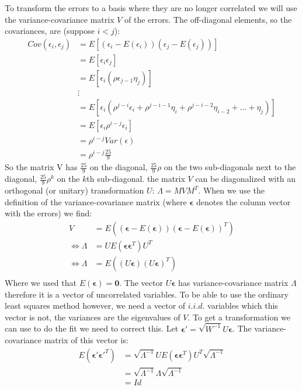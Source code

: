 \documentclass[a4paper]{article}
\begin{document}
To transform the errors to a basis where they are no longer correlated we will use the variance-covariance matrix $V$ of the errors. 
The off-diagonal elements, so the covariances, are (suppose $i < j$):
\begin{align*}
	Cov(\epsilon_i, \epsilon_j) &= E[(\epsilon_i-E(\epsilon_i))(\epsilon_j-E(\epsilon_j))]\\
				    &= E[\epsilon_i \epsilon_j]\\
				    &= E[\epsilon_i (\rho\epsilon_{j-1} \eta_j)]\\
				    &\vdots\\
				    &= E[\epsilon_i (\rho^{j-i} \epsilon_i + \rho^{j-i-1}\eta_i + \rho^{j-i-2}\eta_{i-2} + \ldots + \eta_j)]\\
				    &= E[\epsilon_i \rho^{i-j} \epsilon_i]\\
				    &= \rho^{i-j} Var(\epsilon)\\
				    &= \rho^{i-j} \frac{25}{9}
\end{align*}
So the matrix V has $ \frac{25}{9}$ on the diagonal, $ \frac{25}{9}\rho $ on the two sub-diagonals next to the diagonal, $ \frac{25}{9} \rho^k$ on the $k$th sub-diagonal.
the matrix $V$ can be diagonalized with an orthogonal (or unitary) transformation $U$: $\Lambda = MVM^T$. When we use the definition of the variance-covariance matrix (where $\mathbf{\epsilon}$ denotes the column vector with the errors) we find:
\begin{align*}
	V &= E( (\mathbf{\epsilon} - E(\mathbf{\epsilon})) (\mathbf{\epsilon} - E(\mathbf{\epsilon}))^T)\\
	\Leftrightarrow \Lambda &= U E( \mathbf{\epsilon} \mathbf{\epsilon}^T) U^T\\
	\Leftrightarrow \Lambda &= E( (U\mathbf{\epsilon})(U\mathbf{\epsilon})^T)\\
\end{align*}
Where we used that $E(\mathbf{\epsilon}) = \mathbf{0}$. The vector $U \mathbf{\epsilon}$ has variance-covariance matrix $\Lambda$ therefore it is a vector of uncorrelated variables. 
To be able to use the ordinary least squares method however, we need a vector of $i.i.d.$ variables which this vector is not, the variances are the eigenvalues of $V$. To get a transformation we can use to do the fit we need to correct this. Let $\mathbf{\epsilon}' = \sqrt{W^{-1}} U \mathbf{\epsilon}$. 
The variance-covariance matrix of this vector is:
\begin{align*}
	E(\mathbf{\epsilon}'\mathbf{\epsilon}'^T) &= \sqrt{\Lambda^{-1}} U E(\mathbf{\epsilon}\mathbf{\epsilon}^T) U^T \sqrt{\Lambda^{-1}}\\
						  &= \sqrt{\Lambda^{-1}} \Lambda \sqrt{\Lambda^{-1}}\\
						  &= Id
\end{align*}
\end{document}
